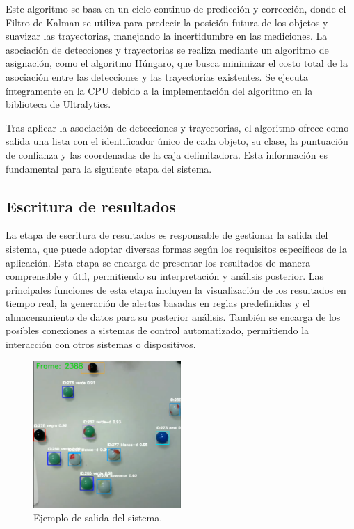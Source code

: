 \documentclass[11pt,spanish,listoffigures,listoftables]{tfgetsinf}
\begin{document}
Este algoritmo se basa en un ciclo continuo de predicción y corrección, donde el Filtro de Kalman se utiliza para predecir la posición futura de los objetos y suavizar las trayectorias, manejando la incertidumbre en las mediciones. La asociación de detecciones y trayectorias se realiza mediante un algoritmo de asignación, como el algoritmo Húngaro\cite{kuhn1955hungarian}, que busca minimizar el costo total de la asociación entre las detecciones y las trayectorias existentes. Se ejecuta íntegramente en la CPU debido a la implementación del algoritmo en la biblioteca de Ultralytics.

Tras aplicar la asociación de detecciones y trayectorias, el algoritmo ofrece como salida una lista con el identificador único de cada objeto, su clase, la puntuación de confianza y las coordenadas de la caja delimitadora. Esta información es fundamental para la siguiente etapa del sistema.

\subsection{Escritura de resultados} \label{sec:escritura_resultados}

La etapa de escritura de resultados es responsable de gestionar la salida del sistema, que puede adoptar diversas formas según los requisitos específicos de la aplicación. Esta etapa se encarga de presentar los resultados de manera comprensible y útil, permitiendo su interpretación y análisis posterior. Las principales funciones de esta etapa incluyen la visualización de los resultados en tiempo real, la generación de alertas basadas en reglas predefinidas y el almacenamiento de datos para su posterior análisis. También se encarga de los posibles conexiones a sistemas de control automatizado, permitiendo la interacción con otros sistemas o dispositivos.

\begin{figure}[H]
   \centering
   \includegraphics[width=0.5\textwidth]{images/diseno_e_implementacion/ejemplo_canicas_resultado.png}
   \caption[Ejemplo de salida del sistema]{Ejemplo de salida del sistema.}
   \label{fig:resultado_sistema}
\end{figure}
\end{document}
